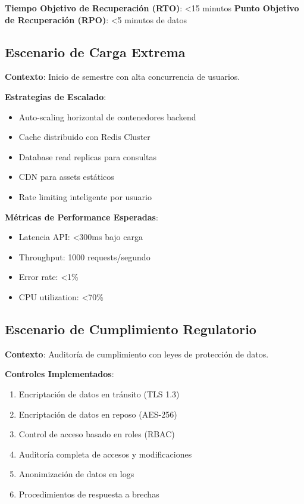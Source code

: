\textbf{Tiempo Objetivo de Recuperación (RTO)}: <15 minutos
\textbf{Punto Objetivo de Recuperación (RPO)}: <5 minutos de datos

\subsection{Escenario de Carga Extrema}

\textbf{Contexto}: Inicio de semestre con alta concurrencia de usuarios.

\textbf{Estrategias de Escalado}:
\begin{itemize}
\item Auto-scaling horizontal de contenedores backend
\item Cache distribuido con Redis Cluster
\item Database read replicas para consultas
\item CDN para assets estáticos
\item Rate limiting inteligente por usuario
\end{itemize}

\textbf{Métricas de Performance Esperadas}:
\begin{itemize}
\item Latencia API: <300ms bajo carga
\item Throughput: 1000 requests/segundo
\item Error rate: <1\%
\item CPU utilization: <70\%
\end{itemize}

\subsection{Escenario de Cumplimiento Regulatorio}

\textbf{Contexto}: Auditoría de cumplimiento con leyes de protección de datos.

\textbf{Controles Implementados}:
\begin{enumerate}
\item Encriptación de datos en tránsito (TLS 1.3)
\item Encriptación de datos en reposo (AES-256)
\item Control de acceso basado en roles (RBAC)
\item Auditoría completa de accesos y modificaciones
\item Anonimización de datos en logs
\item Procedimientos de respuesta a brechas
\end{enumerate}


